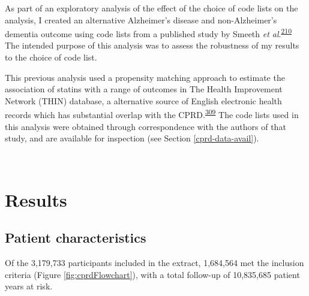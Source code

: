 \documentclass[a4paper, twoside]{templates/ociamthesis}
\begin{document}
As part of an exploratory analysis of the effect of the choice of code lists on the analysis, I created an alternative Alzheimer's disease and non-Alzheimer's dementia outcome using code lists from a published study by Smeeth \emph{et al}.\textsuperscript{\protect\hyperlink{ref-smeeth2009}{210}} The intended purpose of this analysis was to assess the robustness of my results to the choice of code list.

This previous analysis used a propensity matching approach to estimate the association of statins with a range of outcomes in The Health Improvement Network (THIN) database, a alternative source of English electronic health records which has substantial overlap with the CPRD.\textsuperscript{\protect\hyperlink{ref-carbonari2015}{309}} The code lists used in this analysis were obtained through correspondence with the authors of that study, and are available for inspection (see Section \ref{cprd-data-avail}).

~

\hypertarget{results-1}{%
\section{Results}\label{results-1}}

\hypertarget{patient-characteristics}{%
\subsection{Patient characteristics}\label{patient-characteristics}}

Of the 3,179,733 participants included in the extract, 1,684,564 met the inclusion criteria (Figure \ref{fig:cprdFlowchart}), with a total follow-up of 10,835,685 patient years at risk.

~
\end{document}
